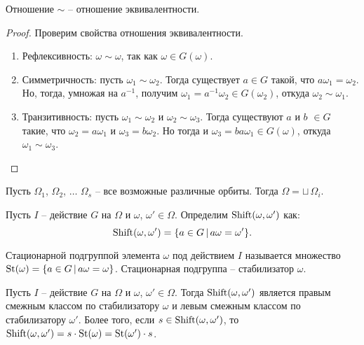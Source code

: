 \begin{proposition}
    Отношение $\sim$ -- отношение эквивалентности.
\end{proposition}

\begin{proof} 
    Проверим свойства отношения эквивалентности.
    \begin{enumerate}
        \item Рефлексивность: $\omega \sim \omega$, так как $\omega \in G(\omega)$.
        \item Симметричность: пусть $\omega_1 \sim \omega_2$. Тогда существует $a \in G$ такой, что 
        $a\omega_1 = \omega_2$. Но, тогда, умножая на $a^{-1}$, получим $\omega_1 = a^{-1}\omega_2 \in G(\omega_2)$, откуда 
        $\omega_2 \sim \omega_1$.
        \item Транзитивность: пусть $\omega_1 \sim \omega_2$ и $\omega_2 \sim \omega_3$. 
        Тогда существуют $a$ и $b$ $\in G$ такие, что $\omega_2 = a \omega_1$ и $\omega_3 = b \omega_2$.
        Но тогда и $\omega_3 = ba \omega_1 \in G(\omega)$, откуда $\omega_1 \sim \omega_3$.
    \end{enumerate}
\end{proof}

\begin{corollary}
    Пусть $\Omega_1$, $\Omega_2$, $\dots$ $\Omega_s$ -- все возможные различные орбиты. Тогда 
    $\Omega = \sqcup \, \Omega_i$.
\end{corollary}

\begin{definition}
    Пусть $I$ -- действие $G$ на $\Omega$ и $\omega$, $\omega' \in \Omega$. Определим 
    $\operatorname{\text{Shift}}(\omega, \omega')$ как: $$\operatorname{\text{Shift}}(\omega, \omega') = \{a \in G \, | \, a\omega = \omega'\}.$$
\end{definition}

\begin{definition}
    Стационарной подгруппой элемента $\omega$ под действием $I$ называется множество 
    $\operatorname{\text{St}}(\omega) = \{a \in G \, | \, a\omega = \omega\}$. Стационарная подгруппа -- 
    стабилизатор $\omega$.
\end{definition}

\begin{proposition}
    Пусть $I$ -- действие $G$ на $\Omega$ и $\omega$, $\omega' \in \Omega$. Тогда 
    $\operatorname{\text{Shift}}(\omega, \omega')$ является правым смежным классом по стабилизатору $\omega$ и левым 
    смежным классом по стабилизатору $\omega'$.
    Более того, если $s \in \operatorname{\text{Shift}}(\omega, \omega')$, то $\operatorname{\text{Shift}}(\omega, \omega') = s \cdot 
    \operatorname{\text{St}}(\omega) = \operatorname{\text{St}}(\omega') \cdot s$.
\end{proposition}

